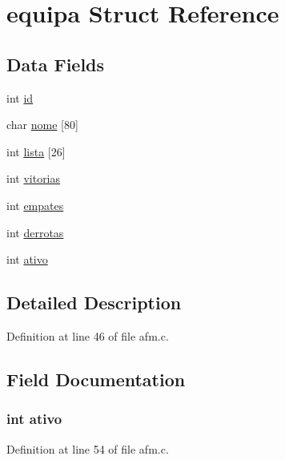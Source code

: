 \hypertarget{structequipa}{\section{equipa \-Struct \-Reference}
\label{structequipa}
}
\subsection*{\-Data \-Fields}
\begin{DoxyCompactItemize}
\item 
int \hyperlink{structequipa_a7441ef0865bcb3db9b8064dd7375c1ea}{id}
\item 
char \hyperlink{structequipa_a2fe8d29936547b4ede632f419ea32367}{nome} \mbox{[}80\mbox{]}
\item 
int \hyperlink{structequipa_ae4169594b69b603d4d756c4b127b58ec}{lista} \mbox{[}26\mbox{]}
\item 
int \hyperlink{structequipa_a1fe4593c9060bf2d8f69a78b9af1f60b}{vitorias}
\item 
int \hyperlink{structequipa_a4ea65a038afceee592fe0b4a9eeebf98}{empates}
\item 
int \hyperlink{structequipa_aec0b9c1802275e055b4245b4d74e6733}{derrotas}
\item 
int \hyperlink{structequipa_a5bc3bc4334890083c1af35103dae7964}{ativo}
\end{DoxyCompactItemize}


\subsection{\-Detailed \-Description}


\-Definition at line 46 of file afm.\-c.



\subsection{\-Field \-Documentation}
\hypertarget{structequipa_a5bc3bc4334890083c1af35103dae7964}{
\subsubsection[{ativo}]{\setlength{\rightskip}{0pt plus 5cm}int {\bf ativo}}}\label{structequipa_a5bc3bc4334890083c1af35103dae7964}


\-Definition at line 54 of file afm.\-c.

